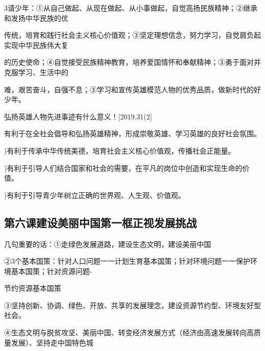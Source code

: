 \documentclass[lang=cn,11pt]{elegantbook}
\newcommand{\daofasym}[1]{{\daofasymbolfont #1}}
\newcommand{\daofasym}[1]{#1}
\begin{document}
3请少年：\daofasym{①}从自己做起、从现在做起、从小事做起，自觉高扬民族精神；\daofasym{②}继承和发扬中华民族的优\par

传统，培育和践行社会主义核心价值观；\daofasym{③}坚定理想信念，努力学习，自觉肩负起实现中华民族伟大复\par

的历史使命；\daofasym{④}自觉接受民族精神教育，培养爱国情怀和奉献精神；\daofasym{③}勇于面对并克服学习、生活中的\par

难，艰苦奋斗，自强不息；\daofasym{③}学习和宣传英雄模范人物的优秀品质，做新时代的好少年。\par

弘扬英雄人物先进事迹有什么意义！[2019.31(2]\par

有利于在全社会倡导和弘扬英雄精神，形成崇敬英雄、学习英雄的良好社会氛围。\par

)有利于传承中华传统美德，培育社会主义核心价值观，传播社会正能量。\par

)有利于引导人们结合国家和社会的需要，在平凡的岗位中创造和实现生命的价值。\par

)有利于引导青少年树立正确的世界观、人生观、价值观。\par

\subsection*{第六课建设美丽中国第一框正视发展挑战}

几句重要的话：\daofasym{①}走绿色发展道路，建设生态文明，建设美丽中国\par

\daofasym{②}3个基本国策：针对人口问题一一计划生育基本国策；针对环境问题一一保护环境基本国策；针对资源问题-\par

节约资源基本国策\par

\daofasym{③}坚持创新、协调、绿色、开放、共享的发展理念，建设资源节约型、环境友好型社会。\par

\daofasym{④}生态文明与脱贫攻坚、美丽中国、转变经济发展方式（经济由高速发展转向高质量发展）、坚持走中国特色城\par
\end{document}

